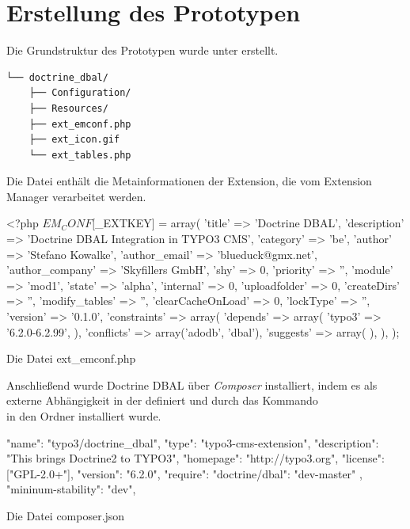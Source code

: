 \section{Erstellung des Prototypen}
\label{prototype:sec:createPrototype}
Die Grundstruktur des Prototypen wurde unter  erstellt.

\begin{Verbatim}[samepage=true]
└── doctrine_dbal/
    ├── Configuration/
    ├── Resources/
    ├── ext_emconf.php
    ├── ext_icon.gif
    └── ext_tables.php
\end{Verbatim}

Die Datei  enthält die Metainformationen der Extension, die vom Extension Manager verarbeitet werden.

\begin{listing}
\begin{phpcode}
<?php
$EM_CONF[$_EXTKEY] = array(
	'title' => 'Doctrine DBAL',
	'description' => 'Doctrine DBAL Integration in TYPO3 CMS',
	'category' => 'be',
	'author' => 'Stefano Kowalke',
	'author_email' => 'blueduck@gmx.net',
	'author_company' => 'Skyfillers GmbH',
	'shy' => 0,
	'priority' => '',
	'module' => 'mod1',
	'state' => 'alpha',
	'internal' => 0,
	'uploadfolder' => 0,
	'createDirs' => '',
	'modify_tables' => '',
	'clearCacheOnLoad' => 0,
	'lockType' => '',
	'version' => '0.1.0',
	'constraints' => array(
		'depends' => array(
			'typo3' => '6.2.0-6.2.99',
		),
		'conflicts' => array('adodb', 'dbal'),
		'suggests' => array(
		),
	),
);
\end{phpcode}
\caption{Die Datei ext\_emconf.php}
\label{lst:extEmconf}
\end{listing}

Anschließend wurde Doctrine DBAL über \textit{Composer} installiert, indem es als externe Abhängigkeit in der  definiert und durch das Kommando\\  in den Ordner  installiert wurde.

\begin{listing}[H]
\begin{jsoncode}
{
	"name": "typo3/doctrine_dbal",
	"type": "typo3-cms-extension",
	"description": "This brings Doctrine2 to TYPO3",
	"homepage": "http://typo3.org",
	"license": ["GPL-2.0+"],
	"version": "6.2.0",
	"require": {
		"doctrine/dbal": "dev-master"
	},
	"mininum-stability": "dev",
}
\end{jsoncode}
\caption{Die Datei composer.json}
\label{lst:composer}
\end{listing}


